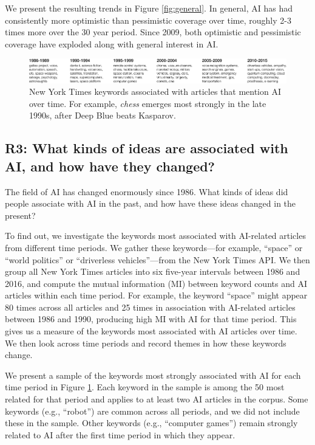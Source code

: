 \documentclass[letterpaper]{article}
\begin{document}
We present the resulting trends in Figure \ref{fig:general}. In general, AI has had consistently more optimistic than pessimistic coverage over time, roughly 2-3 times more over the 30 year period. Since 2009, both optimistic and pessimistic coverage have exploded along with general interest in AI.

\begin{figure}[!t]
\centering
\includegraphics[width=2.0\columnwidth]{topics-over-time}
\caption{New York Times keywords associated with articles that mention AI over time. For example, \textit{chess} emerges most strongly in the late 1990s, after Deep Blue beats Kasparov.}
\label{fig:keywords}
\end{figure}

\subsection{R3: What kinds of ideas are associated with AI, and how have they changed?}

The field of AI has changed enormously since 1986. What kinds of ideas did people associate with AI in the past, and how have these ideas changed in the present?

To find out, we investigate the keywords most associated with AI-related articles from different time periods. We gather these keywords---for example, ``space'' or ``world politics'' or ``driverless vehicles''---from the New York Times API. We then group all New York Times articles into six five-year intervals between 1986 and 2016, and compute the mutual information (MI) between keyword counts and AI articles within each time period. For example, the keyword ``space'' might appear 80 times across all articles and 25 times in association with AI-related articles between 1986 and 1990, producing high MI with AI for that time period. This gives us a measure of the keywords most associated with AI articles over time. We then look across time periods and record themes in how these keywords change.

We present a sample of the keywords most strongly associated with AI for each time period in Figure \ref{fig:keywords}. Each keyword in the sample is among the 50 most related for that period and applies to at least two AI articles in the corpus. Some keywords (e.g., ``robot'') are common across all periods, and we did not include these in the sample. Other keywords (e.g., ``computer games'') remain strongly related to AI after the first time period in which they appear.
\end{document}
